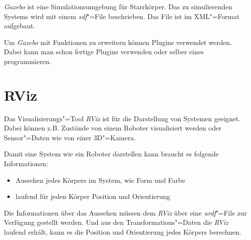 \textit{Gazebo} ist eine Simulationsumgebung für Starrkörper.
Das zu simulierenden Systems wird mit einem \textit{sdf}"=File beschrieben. %
Das File ist im XML"=Format aufgebaut.

Um \textit{Gazebo} mit Funktionen zu erweitern können Plugins verwendet werden.
Dabei kann man schon fertige Plugins verwenden oder selber eines programmieren. %

\section{RViz}
Das Visualisierungs"=Tool \textit{RViz} ist für die Darstellung von Systemen geeignet.
Dabei können z.B. Zustände von einem Roboter visualisiert werden oder Sensor"=Daten wie von einer 3D"=Kamera.

Damit  eine System wie ein Roboter darstellen kann braucht es folgende Informationen:
\begin{itemize}
\item Aussehen jedes Körpers im System, wie Form und Farbe 
\item laufend für jeden Körper Position und Orientierung
\end{itemize}

Die Informationen über das Aussehen müssen dem \textit{RViz} über eine \textit{urdf}"=File zur Verfügung gestellt werden. %
Und aus den Transformations"=Daten die \textit{RViz} laufend erhält, kann es die Position und Orientierung jedes Körpers berechnen. %




